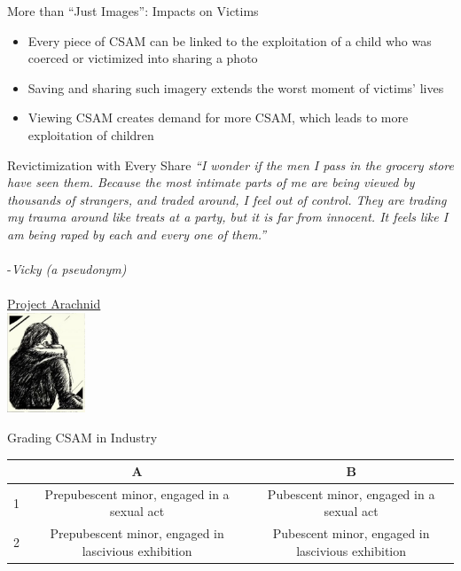 \documentclass[nobackground,dvipsnames,table,aspectratio=169]{beamer}
\begin{document}
\begin{frame}{More than “Just Images”: Impacts on Victims}
    \begin{itemize}
        \item Every piece of CSAM can be linked to the exploitation of a child who was coerced or victimized into sharing a photo
        \item Saving and sharing such imagery extends the worst moment of victims’ lives 
        \item Viewing CSAM creates demand for more CSAM, which leads to more exploitation of children
    \end{itemize}
\end{frame}

\begin{frame}{Revictimization with Every Share}
    \textit{“I wonder if the men I pass in the grocery store have seen them. Because the most intimate parts of me are being viewed by thousands of strangers, and traded around, I feel out of control. They are trading my trauma around like treats at a party, but it is far from innocent. It feels like I am being raped by each and every one of them.”}\\~\\
    
    -\textit{Vicky (a pseudonym)}\\~\\
    \tiny
    \href{https://protectchildren.ca/en/programs-and-initiatives/project-arachnid/}{Project Arachnid}\\
    \includegraphics[width=0.175\textwidth]{sketch}
\end{frame}

\begin{frame}{Grading CSAM in Industry}
    \centering
    \begin{tabular}{|c|c|c|}%
        \hline
         & A & B\\
        \hline
        1 & Prepubescent minor, engaged in a sexual act & Pubescent minor, engaged in a sexual act\\
        \hline
        2 & Prepubescent minor, engaged in lascivious exhibition & Pubescent minor, engaged in lascivious exhibition\\
        \hline
    \end{tabular}
\end{frame}
\end{document}
